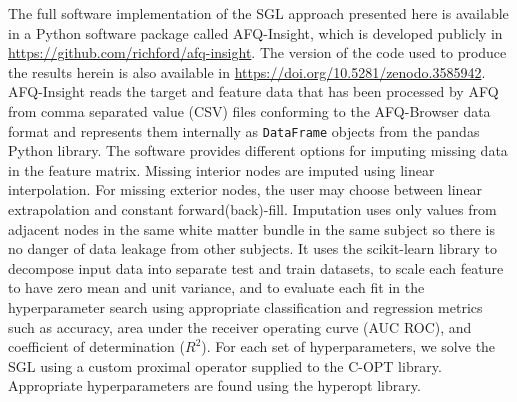 The full software implementation of the SGL approach presented here is available
in a Python software package called AFQ-Insight, which is developed publicly in
\url{https://github.com/richford/afq-insight}. The version of the code used to
produce the results herein is also available in
\url{https://doi.org/10.5281/zenodo.3585942}.
AFQ-Insight reads the target and feature data that has been processed by AFQ
from comma separated value (CSV) files conforming to the AFQ-Browser data
format\cite{yeatman2018browser} and represents them internally as
\lstinline{DataFrame} objects from the pandas Python
library\cite{mckinney2010data}. The software provides different options for
imputing missing data in the feature matrix. Missing interior nodes are imputed
using linear interpolation. For missing exterior nodes, the user may choose
between linear extrapolation and constant forward(back)-fill. Imputation uses
only values from adjacent nodes in the same white matter bundle in the same
subject so there is no danger of data leakage from other subjects. It uses the
scikit-learn\cite{scikit-learn} library to decompose input data into separate
test and train datasets, to scale each feature to have zero mean and
unit variance, and to evaluate each fit in the hyperparameter search using
appropriate classification and regression metrics such as accuracy, area
under the receiver operating curve (AUC ROC), and coefficient of determination
($R^2$). For each set of hyperparameters, we solve the SGL using a custom
proximal operator supplied to the C-OPT library\cite{copt}. Appropriate
hyperparameters are found using the hyperopt library\cite{Bergstra_2015}.
